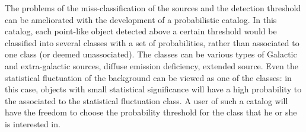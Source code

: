 The problems of the miss-classification of the sources and the detection threshold can be ameliorated
with the development of a probabilistic catalog.
In this catalog, each point-like object detected above a certain threshold
would be classified into several classes with a set of probabilities, rather than associated to one class (or deemed unassociated).
The classes can be various types of Galactic and extra-galactic sources, diffuse emission deficiency, extended source.
Even the statistical fluctuation of the background can be viewed as one of the classes: in this case, objects with small statistical significance
will have a high probability to the associated to the statistical fluctuation class.
A user of such a catalog will have the freedom to choose the probability threshold for the class that he or she is interested in.









